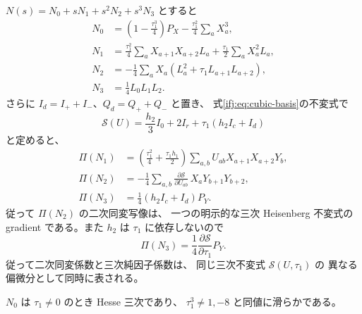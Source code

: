 \begin{proposition}
\label{ifj:prop:central-norm-jets}
$N(s)=N_0+sN_1+s^2N_2+s^3N_3$ とすると
\begin{equation}\label{ifj:eq:central-norm-polynomial}
 \begin{aligned}
 N_0&=\left(1-\frac{\tau_1^3}{4}\right)P_X
                        -\frac{\tau_1^2}{4}\sum_aX_a^3,\\
 N_1&=\frac{\tau_1^2}{4}\sum_a X_{a+1}X_{a+2}L_a
                        +\frac{\tau_1}{2}\sum_aX_a^2L_a,\\
 N_2&=-\frac14\sum_a X_a
                 (L_a^2+\tau_1L_{a+1}L_{a+2}),\\
 N_3&=\frac14L_0L_1L_2.
 \end{aligned}
\end{equation}
さらに $I_d=I_++I_-$、$Q_d=Q_++Q_-$ と置き、
式\eqref{ifj:eq:cubic-basis}の不変式で
\begin{equation}\label{ifj:eq:central-norm-invariant-potential}
 \mathscr S(U)=\frac{h_2}{3}I_0+2I_r+
                     \tau_1(h_2I_c+I_d)
\end{equation}
と定めると、
\begin{equation}\label{ifj:eq:central-norm-projected-jets}
 \begin{aligned}
 \Pi(N_1)&=\left(\frac{\tau_1^2}{4}
                    +\frac{\tau_1h_1}{2}\right)
               \sum_{a,b}U_{ab}X_{a+1}X_{a+2}Y_b,\\
 \Pi(N_2)&=-\frac14\sum_{a,b}
           \frac{\partial\mathscr S}{\partial U_{ab}}\,
                       X_aY_{b+1}Y_{b+2},\\
 \Pi(N_3)&=\frac14(h_2I_c+I_d)P_Y.
 \end{aligned}
\end{equation}
従って $\Pi(N_2)$ の二次同変写像は、
一つの明示的な三次 Heisenberg 不変式の
gradient である。また $h_2$ は $\tau_1$ に依存しないので
\[
 \Pi(N_3)=\frac14\frac{\partial\mathscr S}{\partial\tau_1}P_Y.
\]
従って二次同変係数と三次純因子係数は、
同じ三次不変式 $\mathscr S(U,\tau_1)$ の
異なる偏微分として同時に表される。

$N_0$ は $\tau_1\ne0$ のとき Hesse 三次であり、
$\tau_1^3\ne1,-8$ と同値に滑らかである。
\end{proposition}

